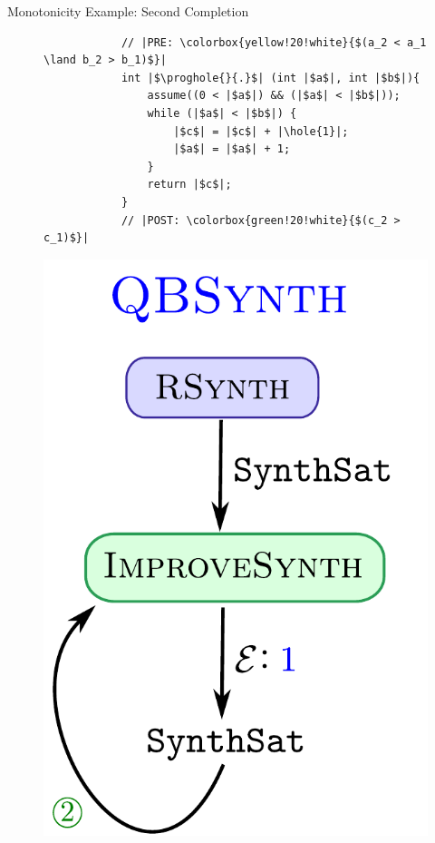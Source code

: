 \documentclass[9pt]{beamer}
\newcommand{\hole}[1]{\fbox{\ensuremath{#1}}}
\newcommand{\prog}{\ensuremath{\mathcal{P}}\xspace}
\newcommand{\proghole}[2]{\ensuremath{\prog_{#1}^{[#2]}}}
\begin{document}
\begin{frame}[fragile]{Monotonicity Example: Second Completion}
        \begin{figure}[t]
    \begin{minipage}{0.45\columnwidth}
        \begin{verbatim}
            // |PRE: \colorbox{yellow!20!white}{$(a_2 < a_1 \land b_2 > b_1)$}|
            int |$\proghole{}{.}$| (int |$a$|, int |$b$|){
                assume((0 < |$a$|) && (|$a$| < |$b$|));
                while (|$a$| < |$b$|) {
                    |$c$| = |$c$| + |\hole{1}|;
                    |$a$| = |$a$| + 1;
                }
                return |$c$|;
            }
            // |POST: \colorbox{green!20!white}{$(c_2 > c_1)$}|
        \end{verbatim}
    \end{minipage}
    \begin{minipage}{0.45\columnwidth}
        \centering
        \includegraphics[scale=0.3]{assets/stage2.pdf}
    \end{minipage}
\end{figure}
\end{frame}
\end{document}
